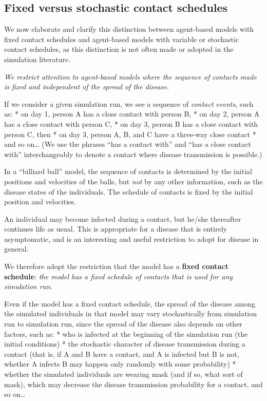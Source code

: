 \documentclass[11pt]{article}
\begin{document}
    \hypertarget{fixed-versus-stochastic-contact-schedules}{%
\subsection{Fixed versus stochastic contact
schedules}\label{fixed-versus-stochastic-contact-schedules}}

We now elaborate and clarify this distinction between agent-based models
with fixed contact schedules and agent-based models with variable or
stochastic contact schedules, as this distinction is not often made or
adopted in the simulation literature.

\emph{We restrict attention to agent-based models where the sequence of
contacts made is fixed and independent of the spread of the disease}.

If we consider a given simulation run, we see a sequence of
\emph{contact events}, such as: * on day 1, person A has a close contact
with person B, * on day 2, person A has a close contact with person C, *
on day 3, person B has a close contact with person C, then * on day 3,
person A, B, and C have a three-way close contact * and so on\ldots{}
(We use the phrases ``has a contact with'' and ``has a close contact
with'' interchangeably to denote a contact where disease transmission is
possible.)

In a ``billiard ball'' model, the sequence of contacts is determined by
the initial positions and velocities of the balls, but \emph{not} by any
other information, such as the disease states of the individuals. The
schedule of contacts is fixed by the initial position and velocities.

An individual may become infected during a contact, but he/she
thereafter continues life as usual. This is appropriate for a disease
that is entirely asymptomatic, and is an interesting and useful
restriction to adopt for disease in general.

We therefore adopt the restriction that the model has a \textbf{fixed
contact schedule}: \emph{the model has a fixed schedule of contacts that
is used for any simulation run}.

Even if the model has a fixed contact schedule, the spread of the
disease among the simulated individuals in that model may vary
stochastically from simulation run to simulation run, since the spread
of the disease also depends on other factors, such as: * who is infected
at the beginning of the simulation run (the initial conditions) * the
stochastic character of disease transmission during a contact (that is,
if A and B have a contact, and A is infected but B is not, whether A
infects B may happen only randomly with some probability) * whether the
simulated individuals are wearing mask (and if so, what sort of mask),
which may decrease the disease transmission probability for a contact,
and so on\ldots{}
\end{document}
